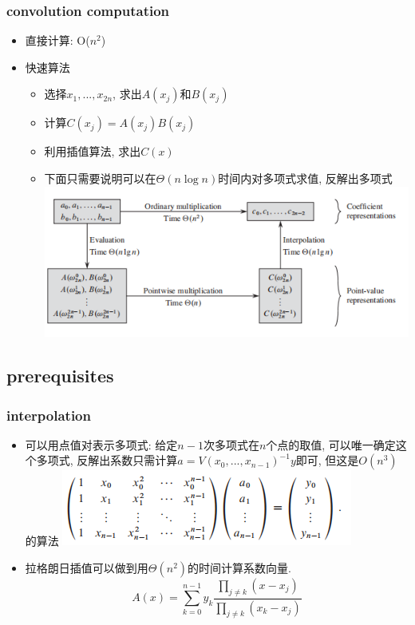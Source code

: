 \documentclass[cjk]{beamer}
\begin{document}
\begin{CJK*}{UTF8}{gbsn}
    \begin{frame}
      \frametitle{convolution computation}
      \begin{itemize}
        \item 直接计算: O($n^2$)
        \item 快速算法
          \begin{itemize}
            \item 选择$x_1, ..., x_{2n}$, 求出$A(x_j)$和$B(x_j)$
            \item 计算$C(x_j) = A(x_j)B(x_j)$
            \item 利用插值算法, 求出$C(x)$
            \item 下面只需要说明可以在$\Theta(n\log n)$时间内对多项式求值, 反解出多项式
              \newline
              \includegraphics[scale = 0.5]{1.png}
          \end{itemize}
      \end{itemize}
    \end{frame}

  \subsection{prerequisites}
    \begin{frame}
      \frametitle{interpolation}
      \begin{itemize}
        \item 可以用点值对表示多项式: 给定$n - 1$次多项式在$n$个点的取值, 可以唯一确定这个多项式, 反解出系数只需计算$a = V(x_0, ..., x_{n - 1})^{-1}y$即可, 但这是$O(n^3)$的算法
          \newline
          \includegraphics[scale = 0.75]{4.png}
        \item 拉格朗日插值可以做到用$\Theta(n^2)$的时间计算系数向量.
          \begin{equation*}
            A(x) = \sum_{k = 0}^{n - 1}y_k \frac{\prod\limits_{j \neq k}(x - x_j)}{\prod\limits_{j \neq k}(x_k - x_j)}
          \end{equation*}
      \end{itemize}
    \end{frame}


\end{CJK*}
\end{document}
